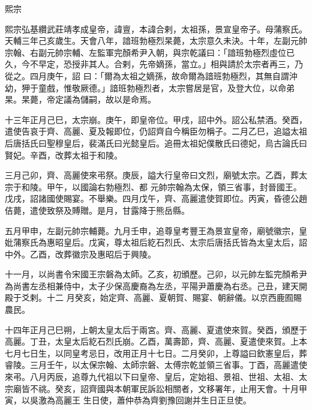 
\begin{pinyinscope}

 熙宗



 熙宗弘基纘武莊靖孝成皇帝，諱亶，本諱合剌，太祖孫，景宣皇帝子。母蒲察氏。天輔三年己亥歲生。天會八年，諳班勃極烈杲薨，太宗意久未決。十年，左副元帥宗翰、右副元帥宗輔、左監軍完顏希尹入朝，與宗乾議曰：「諳班勃極烈虛位已久，今不早定，恐授非其人。合剌，先帝嫡孫，當立。」相與請於太宗者再三，乃從之。四月庚午，詔
 曰：「爾為太祖之嫡孫，故命爾為諳班勃極烈，其無自謂沖幼，狎于童戲，惟敬厥德。」諳班勃極烈者，太宗嘗居是官，及登大位，以命弟杲。杲薨，帝定議為儲嗣，故以是命焉。



 十三年正月己巳，太宗崩。庚午，即皇帝位。甲戌，詔中外。詔公私禁酒。癸酉，遣使告哀于齊、高麗、夏及報即位，仍詔齊自今稱臣勿稱子。二月乙巳，追謚太祖后唐括氏曰聖穆皇后，裴滿氏曰光懿皇后。追冊太祖妃僕散氏曰德妃，烏古論氏曰賢妃。辛酉，改葬太祖于和陵。



 三月己卯，齊、高麗使來弔祭。庚辰，謚大行皇帝曰文烈，廟號太宗。乙酉，葬太宗于和陵。甲午，以國論右勃極烈、都
 元帥宗翰為太保，領三省事，封晉國王。戊戌，詔諸國使賜宴。不舉樂。四月戊午，齊、高麗遣使賀即位。丙寅，昏德公趙佶薨，遣使致祭及賻贈。是月，甘露降于熊岳縣。



 五月甲申，左副元帥宗輔薨。九月壬申，追尊皇考豐王為景宣皇帝，廟號徽宗，皇妣蒲察氏為惠昭皇后。戊寅，尊太祖后紇石烈氏、太宗后唐括氏皆為太皇太后，詔中外。乙酉，改葬徽宗及惠昭后于興陵。



 十一月，以尚書令宋國王宗磐為太師。乙亥，初頒歷。己卯，以元帥左監完顏希尹為尚書左丞相兼侍中，太子少保高慶裔為左丞，平陽尹蕭慶為右丞。己丑，建天開殿于爻剌。十二
 月癸亥，始定齊、高麗、夏朝賀、賜宴、朝辭儀。以京西鹿囿賜農民。



 十四年正月己巳朔，上朝太皇太后于兩宮。齊、高麗、夏遣使來賀。癸酉，頒歷于高麗。丁丑，太皇太后紇石烈氏崩。乙酉，萬壽節，齊、高麗、夏遣使來賀。上本七月七日生，以同皇考忌日，改用正月十七日。二月癸卯，上尊謚曰欽憲皇后，葬睿陵。三月壬午，以太保宗翰、太師宗磐、太傅宗乾並領三省事。丁酉，高麗遣使來弔。八月丙辰，追尊九代祖以下曰皇帝、皇后，定始祖、景祖、世祖、太祖、太宗廟皆不祧。癸亥，詔齊國與本朝軍民訴訟相關者，文移署年，止用天會。十月甲寅，以吳激為高麗王
 生日使，蕭仲恭為齊劉豫回謝并生日正旦使。




\end{pinyinscope}
